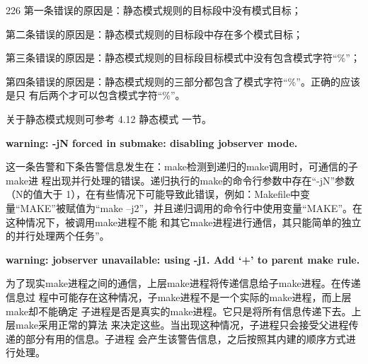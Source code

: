 \begin{dinglist}{226}
第一条错误的原因是：静态模式规则的目标段中没有模式目标；

第二条错误的原因是：静态模式规则的目标段中存在多个模式目标；

第三条错误的原因是：静态模式规则的目标段目标模式中没有包含模式字符“\%”；

第四条错误的原因是：静态模式规则的三部分都包含了模式字符“\%”。正确的应该是只
有后两个才可以包含模式字符“\%”。

关于静态模式规则可参考 4.12 静态模式 一节。

  \item \begin{minipage}[t]{\linewidth}
          \textbf{warning: -jN forced in submake: disabling jobserver mode.}
        \end{minipage}

这一条告警和下条告警信息发生在：make检测到递归的make调用时，可通信的子make进
程出现并行处理的错误。递归执行的make的命令行参数中存在“-jN”参数（N的值大于
1），在有些情况下可能导致此错误，例如：Makefile中变量“MAKE”被赋值为“make
–j2”，并且递归调用的命令行中使用变量“MAKE”。在这种情况下，被调用make进程不能
和其它make进程进行通信，其只能简单的独立的并行处理两个任务”。

  \item \begin{minipage}[t]{\linewidth}
          \textbf{warning: jobserver unavailable: using -j1. Add `+' to parent make rule.}
        \end{minipage}

为了现实make进程之间的通信，上层make进程将传递信息给子make进程。在传递信息过
程中可能存在这种情况，子make进程不是一个实际的make进程，而上层make却不能确定
子进程是否是真实的make进程。它只是将所有信息传递下去。上层make采用正常的算法
来决定这些。当出现这种情况，子进程只会接受父进程传递的部分有用的信息。子进程
会产生该警告信息，之后按照其内建的顺序方式进行处理。

\end{dinglist}
